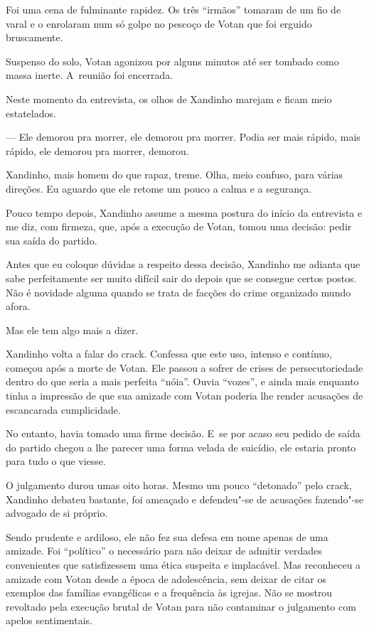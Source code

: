 Foi uma cena de fulminante rapidez. Os três ``irmãos'' tomaram de um fio
de varal e o enrolaram num só golpe no pescoço de Votan que foi erguido
bruscamente.

Suspenso do solo, Votan agonizou por alguns minutos até ser tombado como
massa inerte. A~reunião foi encerrada.

\asterisc{}

Neste momento da entrevista, os olhos de Xandinho marejam e ficam meio
estatelados.

— Ele demorou pra morrer, ele demorou pra morrer. Podia ser mais rápido,
mais rápido, ele demorou pra morrer, demorou.

Xandinho, mais homem do que rapaz, treme. Olha, meio confuso, para
várias direções. Eu aguardo que ele retome um pouco a calma e a
segurança.

Pouco tempo depois, Xandinho assume a mesma postura do início da
entrevista e me diz, com firmeza, que, após a execução de Votan, tomou
uma decisão: pedir sua saída do partido.

Antes que eu coloque dúvidas a respeito dessa decisão, Xandinho me
adianta que sabe perfeitamente ser muito difícil sair do  depois que
se consegue certos postos. Não é novidade alguma quando se trata de
facções do crime organizado mundo afora.

Mas ele tem algo mais a dizer.

\asterisc

Xandinho volta a falar do crack. Confessa que este uso, intenso e
contínuo, começou após a morte de Votan. Ele passou a sofrer de crises
de persecutoriedade dentro do que seria a mais perfeita ``nóia''. Ouvia
``vozes'', e ainda mais enquanto tinha a impressão de que sua amizade
com Votan poderia lhe render acusações de escancarada cumplicidade.

No entanto, havia tomado uma firme decisão. E~se por acaso seu pedido de
saída do partido chegou a lhe parecer uma forma velada de suicídio, ele
estaria pronto para tudo o que viesse.

O julgamento durou umas oito horas. Mesmo um pouco ``detonado'' pelo
crack, Xandinho debateu bastante, foi ameaçado e defendeu"-se de
acusações fazendo"-se advogado de si próprio.

Sendo prudente e ardiloso, ele não fez sua defesa em nome apenas de uma
amizade. Foi ``político'' o necessário para não deixar de admitir
verdades convenientes que satisfizessem uma ética suspeita e implacável.
Mas reconheceu a amizade com Votan desde a época de adolescência, sem
deixar de citar os exemplos das famílias evangélicas e a frequência às
igrejas. Não se mostrou revoltado pela execução brutal de Votan para não
contaminar o julgamento com apelos sentimentais.

